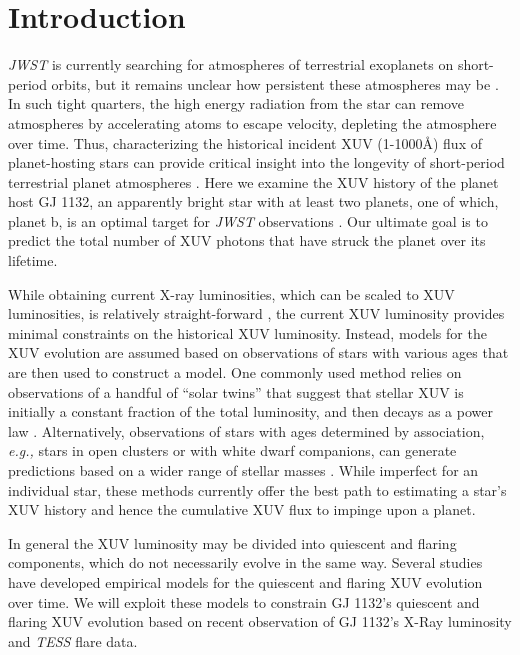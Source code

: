 \documentclass[preprint]{aastex631}
\def\eg{{\it e.g., }}
\def\tess{{\it TESS}\xspace}
\def\jwst{{\it JWST}\xspace}
\begin{document}
\section{Introduction\label{sec:intro}}

\jwst is currently searching for atmospheres of terrestrial exoplanets on short-period orbits, but it remains unclear how persistent these atmospheres may be \citep[see, \eg][]{Kreidberg19,Crossfield22,Xue2024,Mansfield24,Wachiraphan25}. In such tight quarters, the high energy radiation from the star can remove atmospheres by accelerating atoms to escape velocity, depleting the atmosphere over time. Thus, characterizing the historical incident XUV (1-1000\AA) flux of planet-hosting stars can provide critical insight into the longevity of short-period terrestrial planet atmospheres \citep{ZahnleCatling17}. Here we examine the XUV history of the planet host GJ 1132, an apparently bright star with at least two planets, one of which, planet b, is an optimal target for \jwst observations \citep{BertaThompson15}. Our ultimate goal is to predict the total number of XUV photons that have struck the planet over its lifetime.

While obtaining current X-ray luminosities, which can be scaled to XUV luminosities, is relatively straight-forward \citep{MoralesCalderon2024}, the current XUV luminosity provides minimal constraints on the historical XUV luminosity. Instead, models for the XUV evolution are assumed based on observations of stars with various ages that are then used to construct a model. One commonly used method relies on observations of a handful of ``solar twins'' \citep{Ribas05} that suggest that stellar XUV is initially a constant fraction of the total luminosity, and then decays as a power law \citep[see also]{LugerBarnes15}. Alternatively, observations of stars with ages determined by association, \eg stars in open clusters or with white dwarf companions, can generate predictions based on a wider range of stellar masses \citep{Engle24}. While imperfect for an individual star, these methods currently offer the best path to estimating a star's XUV history and hence the cumulative XUV flux to impinge upon a planet.

In general the XUV luminosity may be divided into quiescent and flaring components, which do not necessarily evolve in the same way. Several studies have developed empirical models for the quiescent  \citep{Ribas05, Engle24,France25} and flaring \citep{Loyd18,Davenport19,Ilin19,Guenther20,Feinstein20} XUV evolution over time. We will exploit these models to constrain GJ 1132's quiescent and flaring XUV evolution based on recent observation of GJ 1132's X-Ray luminosity and \tess flare data.
\end{document}
